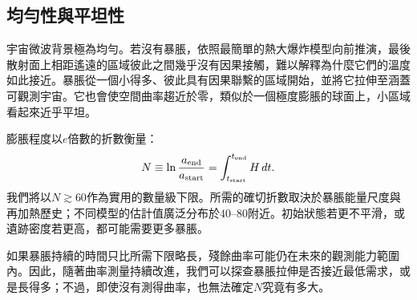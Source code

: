 \subsection{均勻性與平坦性}

宇宙微波背景極為均勻。若沒有暴脹，依照最簡單的熱大爆炸模型向前推演，最後散射面上相距遙遠的區域彼此之間幾乎沒有因果接觸，難以解釋為什麼它們的溫度如此接近。暴脹從一個小得多、彼此具有因果聯繫的區域開始，並將它拉伸至涵蓋可觀測宇宙。它也會使空間曲率趨近於零，類似於一個極度膨脹的球面上，小區域看起來近乎平坦。

膨脹程度以\(e\)倍數的折數衡量：
\begin{equation}
N\equiv \ln\frac{a_{\rm end}}{a_{\rm start}}
=\int_{t_{\rm start}}^{t_{\rm end}}H\,dt.
\label{eq:c09-efolds}
\end{equation}
我們將以\(N\gtrsim60\)作為實用的數量級下限。所需的確切折數取決於暴脹能量尺度與再加熱歷史；不同模型的估計值廣泛分布於\(40\)--\(80\)附近。初始狀態若更不平滑，或遺跡密度若更高，都可能需要更多暴脹。

\begin{classroomqa}
\end{classroomqa}

\begin{classroomqa}
\end{classroomqa}

如果暴脹持續的時間只比所需下限略長，殘餘曲率可能仍在未來的觀測能力範圍內。因此，隨著曲率測量持續改進，我們可以探查暴脹拉伸是否接近最低需求，或是長得多；不過，即使沒有測得曲率，也無法確定\(N\)究竟有多大。

\begin{classroomqa}
\end{classroomqa}

